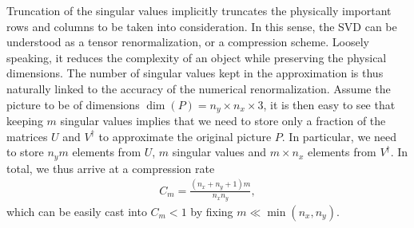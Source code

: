 Truncation of the singular values implicitly truncates the physically important rows and columns to be taken into consideration.
In this sense, the SVD can be understood as a tensor renormalization, or a compression scheme.
Loosely speaking, it reduces the complexity of an object while preserving the physical dimensions.
The number of singular values kept in the approximation is thus naturally linked to the accuracy of the numerical renormalization.
Assume the picture to be of dimensions $\dim(P)=n_y\times n_x\times 3$, it is then easy to see that keeping $m$ singular values implies that we need to store only a fraction of the matrices $U$ and $V^\dag$ to approximate the original picture $P$.
In particular, we need to store $n_y m$ elements from $U$, $m$ singular values and $m\times n_x$ elements from $V^\dag$.
In total, we thus arrive at a compression rate
\begin{align}
    C_m = \frac{(n_x+n_y+1)m}{n_x n_y},
\end{align}
which can be easily cast into $C_m<1$ by fixing $m\ll\min(n_x,n_y)$.
